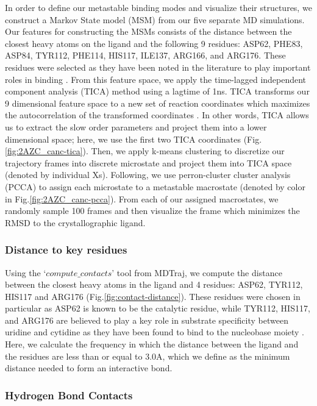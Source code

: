 \documentclass[fleqn,10pt]{wlscirep}
\begin{document}
In order to define our metastable binding modes and visualize their structures, we construct a Markov State model (MSM) \cite{prinz2011markov} from our five separate MD simulations.
Our features for constructing the MSMs consists of the distance between the closest heavy atoms on the ligand and the following 9 residues: ASP62, PHE83, ASP84, TYR112, PHE114, HIS117, ILE137, ARG166, and ARG176.
These residues were selected as they have been noted in the literature to play important roles in binding \cite{tanaka2016molecular}.
From this feature space, we apply the time-lagged independent component analysis (TICA) method using a lagtime of 1ns.
TICA transforms our 9 dimensional feature space to a new set of reaction coordinates which maximizes the autocorrelation of the transformed coordinates \cite{perez2013identification}.
In other words, TICA allows us to extract the slow order parameters and project them into a lower dimensional space; here, we use the first two TICA coordinates (Fig. \ref{fig:2AZC_canc-tica}).
Then, we apply k-means clustering to discretize our trajectory frames into discrete microstate and project them into TICA space (denoted by individual Xs).
Following, we use perron-cluster cluster analysis (PCCA) \cite{roblitz2013fuzzy} to assign each microstate to a metastable macrostate (denoted by color in Fig.\ref{fig:2AZC_canc-pcca}).
From each of our assigned macrostates, we randomly sample 100 frames and then visualize the frame which minimizes the RMSD to the crystallographic ligand.

\subsubsection{Distance to key residues}
Using the `$compute\_contacts$' tool from MDTraj, we compute the distance between the closest heavy atoms in the ligand and 4 residues: ASP62, TYR112, HIS117 and ARG176 (Fig.\ref{fig:contact-distance}).
These residues were chosen in particular as ASP62 is known to be the catalytic residue, while TYR112, HIS117, and ARG176 are believed to play a key role in substrate specificity between uridine and cytidine as they have been found to bind to the nucleobase moiety \cite{tanaka2016molecular}.
Here, we calculate the frequency in which the distance between the ligand and the residues are less than or equal to 3.0A, which we define as the minimum distance needed to form an interactive bond.

\subsubsection{Hydrogen Bond Contacts}
\end{document}
